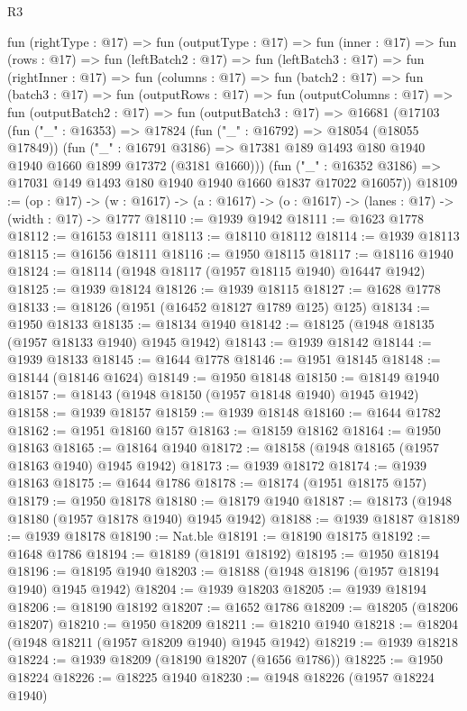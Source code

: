 \begin{lexlean}{R3}
\begin{coremodule}
  fun (rightType : @17) =>
  fun (outputType : @17) =>
  fun (inner : @17) =>
  fun (rows : @17) =>
  fun (leftBatch2 : @17) =>
  fun (leftBatch3 : @17) =>
  fun (rightInner : @17) =>
  fun (columns : @17) =>
  fun (batch2 : @17) =>
  fun (batch3 : @17) =>
  fun (outputRows : @17) =>
  fun (outputColumns : @17) =>
  fun (outputBatch2 : @17) =>
  fun (outputBatch3 : @17) =>
  @16681
    (@17103
      (fun ("_" : @16353) =>
      @17824
        (fun ("_" : @16792) => @18054 (@18055 @17849))
        (fun ("_" : @16791 @3186) =>
        @17381 @189 @1493 @180 @1940 @1940 @1660 @1899 @17372 (@3181 @1660)))
      (fun ("_" : @16352 @3186) => @17031 @149 @1493 @180 @1940 @1940 @1660 @1837 @17022 @16057))
@18109 := (op : @17) ->
  (w : @1617) -> (a : @1617) -> (o : @1617) -> (lanes : @17) -> (width : @17) -> @1777
@18110 := @1939 @1942
@18111 := @1623 @1778
@18112 := @16153 @18111
@18113 := @18110 @18112
@18114 := @1939 @18113
@18115 := @16156 @18111
@18116 := @1950 @18115
@18117 := @18116 @1940
@18124 := @18114 (@1948 @18117 (@1957 @18115 @1940) @16447 @1942)
@18125 := @1939 @18124
@18126 := @1939 @18115
@18127 := @1628 @1778
@18133 := @18126 (@1951 (@16452 @18127 @1789 @125) @125)
@18134 := @1950 @18133
@18135 := @18134 @1940
@18142 := @18125 (@1948 @18135 (@1957 @18133 @1940) @1945 @1942)
@18143 := @1939 @18142
@18144 := @1939 @18133
@18145 := @1644 @1778
@18146 := @1951 @18145
@18148 := @18144 (@18146 @1624)
@18149 := @1950 @18148
@18150 := @18149 @1940
@18157 := @18143 (@1948 @18150 (@1957 @18148 @1940) @1945 @1942)
@18158 := @1939 @18157
@18159 := @1939 @18148
@18160 := @1644 @1782
@18162 := @1951 @18160 @157
@18163 := @18159 @18162
@18164 := @1950 @18163
@18165 := @18164 @1940
@18172 := @18158 (@1948 @18165 (@1957 @18163 @1940) @1945 @1942)
@18173 := @1939 @18172
@18174 := @1939 @18163
@18175 := @1644 @1786
@18178 := @18174 (@1951 @18175 @157)
@18179 := @1950 @18178
@18180 := @18179 @1940
@18187 := @18173 (@1948 @18180 (@1957 @18178 @1940) @1945 @1942)
@18188 := @1939 @18187
@18189 := @1939 @18178
@18190 := Nat.ble
@18191 := @18190 @18175
@18192 := @1648 @1786
@18194 := @18189 (@18191 @18192)
@18195 := @1950 @18194
@18196 := @18195 @1940
@18203 := @18188 (@1948 @18196 (@1957 @18194 @1940) @1945 @1942)
@18204 := @1939 @18203
@18205 := @1939 @18194
@18206 := @18190 @18192
@18207 := @1652 @1786
@18209 := @18205 (@18206 @18207)
@18210 := @1950 @18209
@18211 := @18210 @1940
@18218 := @18204 (@1948 @18211 (@1957 @18209 @1940) @1945 @1942)
@18219 := @1939 @18218
@18224 := @1939 @18209 (@18190 @18207 (@1656 @1786))
@18225 := @1950 @18224
@18226 := @18225 @1940
@18230 := @1948 @18226 (@1957 @18224 @1940)

\end{coremodule}
\end{lexlean}
